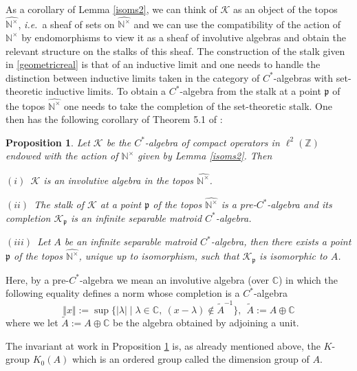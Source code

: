 \documentclass[noams,lp]{compositio}
\newtheorem{prop}[thm]{Proposition}
\newtheorem{rem}[thm]{Remark}
\def\C{{\mathbb C}}
\def\N{{\mathbb N}}
\def\Z{{\mathbb Z}}
\def\cK{{\mathcal K}}
\newcommand{\ie}{{\it i.e.\/}\ }
\def\ffp{\mathfrak{p}}
\def\nt{\N^{\times}}
\def\wnt{{\widehat{\N^{\times}}}}
\begin{document}
As a corollary of Lemma \ref{isoms2}, we can think of $\cK$ as an object of the topos $\wnt$, \ie  a sheaf of sets on $\wnt$ and we can use the compatibility of the action of $\nt$ by endomorphisms to view it as a sheaf of involutive algebras and obtain the relevant structure on the stalks of this sheaf. The construction of the stalk given in \eqref{geometricreal} is that of an inductive limit and one needs to handle the distinction between inductive limits taken in the category of $C^*$-algebras with set-theoretic inductive limits. To obtain a $C^*$-algebra from the stalk at a point $\ffp$ of the topos $\wnt$ one needs to take the completion of the set-theoretic stalk. One then has the following corollary of Theorem 5.1 of \cite{Dixmier}:
\begin{prop}\label{propdix} Let $\cK$ be the $C^*$-algebra of compact operators in $\ell^2(\Z)$ endowed with the action of $\nt$ given by Lemma \ref{isoms2}. Then 

$(i)$~$\cK$ is an involutive algebra in the topos $\wnt$.

$(ii)$~The stalk of $\cK$ at a point $\ffp$ of the topos $\wnt$ is a pre-$C^*$-algebra and its completion $\cK_\ffp$ is an infinite separable matroid $C^*$-algebra. 
 
$(iii)$~Let $A$ be an infinite separable matroid $C^*$-algebra, then there exists a point $\ffp$ of the topos $\wnt$, unique up to isomorphism,
 such that $\cK_\ffp$ is isomorphic to $A$.
\end{prop}

Here, by a pre-$C^*$-algebra we mean an involutive algebra (over $\C$) in which the following equality defines a norm whose completion is a $C^*$-algebra
$$
\Vert x\Vert :=\sup \{\vert\lambda \vert\mid \lambda\in \C, \ (x-\lambda)\notin \tilde A^{-1}\}, \  \  \tilde A:= A\oplus \C
$$
where we let $\tilde A:= A\oplus \C$ be the algebra obtained by adjoining a unit. 

The invariant at work in Proposition \ref{propdix} is, as already mentioned above, the $K$-group $K_0(A)$ which is an ordered group called the dimension group of $A$.

\end{document}

